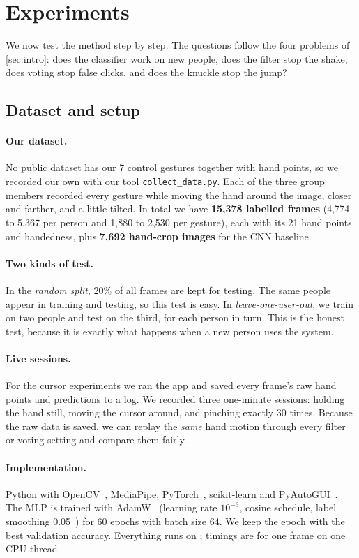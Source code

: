 \section{Experiments}
\label{sec:exp}

We now test the method step by step. The questions follow the four problems
of \cref{sec:intro}: does the classifier work on new people, does the filter
stop the shake, does voting stop false clicks, and does the knuckle stop the
jump?

\subsection{Dataset and setup}
\paragraph{Our dataset.} No public dataset has our 7 control gestures together
with hand points, so we recorded our own with our tool
\texttt{collect\_data.py}. Each of the three group members recorded every
gesture while moving the hand around the image, closer and farther, and a
little tilted. In total we have \textbf{15,378 labelled frames} (4,774 to 5,367
per person and 1,880 to 2,530 per gesture), each with its 21 hand points and
handedness, plus \textbf{7,692 hand-crop images} for the CNN baseline.

\paragraph{Two kinds of test.} In the \emph{random split}, 20\% of all frames
are kept for testing. The same people appear in training and testing, so this
test is easy. In \emph{leave-one-user-out}, we train on two people and test
on the third, for each person in turn. This is the honest test, because it is
exactly what happens when a new person uses the system.

\paragraph{Live sessions.} For the cursor experiments we ran the app and saved
every frame's raw hand points and predictions to a log. We recorded three
one-minute sessions: holding the hand still, moving the cursor around, and
pinching exactly 30 times. Because the raw data is saved, we can replay the
\emph{same} hand motion through every filter or voting setting and compare them
fairly.

\paragraph{Implementation.} Python with OpenCV~\cite{bradski2000opencv},
MediaPipe, PyTorch~\cite{paszke2019pytorch}, scikit-learn and
PyAutoGUI~\cite{pyautogui}. The MLP is trained with
AdamW~\cite{loshchilov2019adamw} (learning rate $10^{-3}$, cosine schedule,
label smoothing 0.05~\cite{szegedy2016rethinking}) for 60 epochs with batch
size 64. We keep the epoch with the best validation accuracy. Everything runs on
\Hardware; timings are for one frame on one CPU thread.

